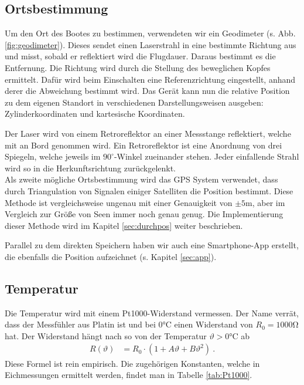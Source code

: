 \documentclass[12pt,a4paper,titlepage,headinclude,bibtotoc]{scrartcl}
\numberwithin{equation}{subsection}
\begin{document}
\subsection{Ortsbestimmung}
\label{sec:theoort}
Um den Ort des Bootes zu bestimmen, verwendeten wir ein Geodimeter (s. Abb. \ref{fig:geodimeter}).
Dieses sendet einen Laserstrahl in eine bestimmte Richtung aus und misst, sobald er reflektiert wird die Flugdauer.
Daraus bestimmt es die Entfernung.
Die Richtung wird durch die Stellung des beweglichen Kopfes ermittelt.
Dafür wird beim Einschalten eine Referenzrichtung eingestellt, anhand derer die Abweichung bestimmt wird.
Das Gerät kann nun die relative Position zu dem eigenen Standort in verschiedenen Darstellungsweisen ausgeben: Zylinderkoordinaten und kartesische Koordinaten.

Der Laser wird von einem Retroreflektor an einer Messstange reflektiert, welche mit an Bord genommen wird.
Ein Retroreflektor ist eine Anordnung von drei Spiegeln, welche jeweils im $90^\circ$-Winkel zueinander stehen.
Jeder einfallende Strahl wird so in die Herkunftsrichtung zurückgelenkt.\\
Als zweite mögliche Ortsbestimmung wird das GPS System verwendet, dass durch Triangulation von Signalen einiger Satelliten die Position bestimmt.
Diese Methode ist vergleichsweise ungenau mit einer Genauigkeit von $\pm5\si{\meter}$, aber im Vergleich zur Größe von Seen immer noch genau genug.
Die Implementierung dieser Methode wird im Kapitel \ref{sec:durchpos} weiter beschrieben.

Parallel zu dem direkten Speichern haben wir auch eine Smartphone-App erstellt, die ebenfalls die Position aufzeichnet (s. Kapitel \ref{sec:app}).


\subsection{Temperatur}
Die Temperatur wird mit einem Pt1000-Widerstand vermessen.
Der Name verrät, dass der Messfühler aus Platin ist und bei $0\si{\celsius}$ einen Widerstand von $R_0=1000\si{\ohm}$ hat.
Der Widerstand hängt nach \cite{Pt1000} so von der Temperatur $\vartheta>0\si{\celsius}$ ab
\begin{align}
	R(\vartheta)&=R_0\cdot\left(1 + A\vartheta + B\vartheta^2\right)~. \label{eq:Pt1000}
\end{align}
Diese Formel ist rein empirisch. 
Die zugehörigen Konstanten, welche in Eichmessungen ermittelt werden, findet man in Tabelle \ref{tab:Pt1000}.
\end{document}
